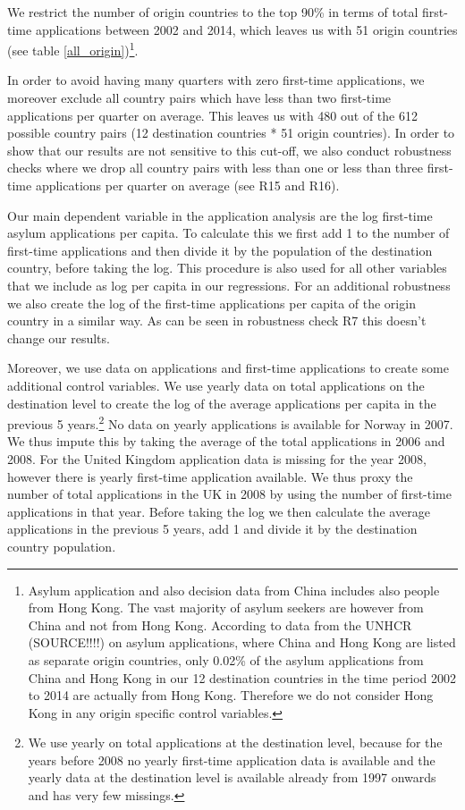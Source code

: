 \documentclass[11pt,a4paper]{scrartcl}
\begin{document}
We restrict the number of origin countries to the top 90\% in terms of total first-time applications between 2002 and 2014, which leaves us with 51 origin countries (see table \ref{all_origin})\footnote{Asylum application and also decision data from China includes also people from Hong Kong. The vast majority of asylum seekers are however from China and not from Hong Kong. According to data from the UNHCR (SOURCE!!!!) on asylum applications, where China and Hong Kong are listed as separate origin countries, only 0.02\% of the asylum applications from China and Hong Kong in our 12 destination countries in the time period 2002 to 2014 are actually from Hong Kong. Therefore we do not consider Hong Kong in any origin specific control variables.}. 

In order to avoid having many quarters with zero first-time applications, we moreover exclude all country pairs which have less than two first-time applications per quarter on average. This leaves us with 480 out of the 612 possible country pairs (12 destination countries * 51 origin countries). In order to show that our results are not sensitive to this cut-off, we also conduct robustness checks where we drop all country pairs with less than one or less than three first-time applications per quarter on average (see R15 and R16).

Our main dependent variable in the application analysis are the log first-time asylum applications per capita. To calculate this we first add 1 to the number of first-time applications and then divide it by the population of the destination country, before taking the log. This procedure is also used for all other variables that we include as log per capita in our regressions. For an additional robustness we also create the log of the first-time applications per capita of the origin country in a similar way. As can be seen in robustness check R7 this doesn't change our results.

Moreover, we use data on applications and first-time applications to create some additional control variables. We use yearly data on total applications on the destination level to create the log of the average applications per capita in the previous 5 years.\footnote{We use yearly on total applications at the destination level, because for the years before 2008 no yearly first-time application data is available and the yearly data at the destination level is available already from 1997 onwards and has very few missings.} No data on yearly applications is available for Norway in 2007. We thus impute this by taking the average of the total applications in 2006 and 2008. For the United Kingdom application data is missing for the year 2008, however there is yearly first-time application available. We thus proxy the number of total applications in the UK in 2008 by using the number of first-time applications in that year. Before taking the log we then calculate the average applications in the previous 5 years, add 1 and divide it by the destination country population. 
\end{document}

